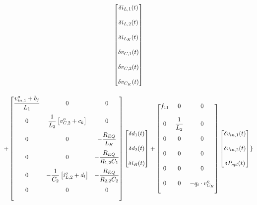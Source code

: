 \begin{gather}
  \begin{bmatrix}
    \delta i_{L,1}(t) \\[12pt] \delta i_{L,2}(t) \\[12pt] \delta i_{L_K}(t) \\[12pt]
    \delta v_{C,1}(t) \\[12pt] \delta v_{C,2}(t) \\[12pt] \delta v_{C_K}(t)
  \end{bmatrix} \notag \\[12pt] +
    \begin{bmatrix}
    \displaystyle \frac{v_{in,1}^o + b_j}{L_1} & 0                 & 0                                                        \\[12pt]
    0                      & \displaystyle \frac{1}{L_2} \left[ v_{C,2}^o + c_k \right]     & 0                              
                                    \\[12pt]
    0                      & 0                 & - \displaystyle \frac{R_{EQ}}{L_K}                                     \\[12pt]
    0                      & 0                 & - \displaystyle \frac{R_{EQ}}{R_{1,2}C_1}                    \\[12pt]
    0                      & - \displaystyle \frac{1}{C_2} \left[ i_{L,2}^o + d_l \right]                 & - \displaystyle \frac{R_{EQ}}{R_{2,2}C_2}                                      \\[12pt]
    0                      & 0                 & 0 
                                    \\[12pt]
  \end{bmatrix}
  \begin{bmatrix}
    \delta d_1(t) \\[12pt] \delta d_2(t) \\[12pt] \delta i_{B}(t)
  \end{bmatrix} +
  \begin{bmatrix}
      f_{11} & 0                   & 0
                            \\[12pt]
      0 & \displaystyle \frac{1}{L_2}   & 0 
                            \\[12pt]
      0 & 0                   & 0
                            \\[12pt]
      0 & 0                   & 0
                            \\[12pt]
      0 & 0                   & 0
                            \\[12pt]
      0 & 0                   & - \displaystyle q_i \cdot v_{C_K}^o
                            \\[12pt]
  \end{bmatrix}
  \begin{bmatrix}
    \delta v_{in,1}(t) \\[12pt] \delta v_{in,2}(t) \\[12pt] \delta P_{cpl}(t)
  \end{bmatrix}
  \}
\end{gather}


